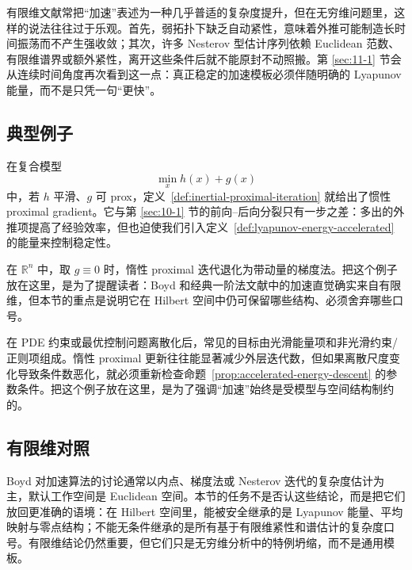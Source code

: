 \begin{remark}[无穷维中的加速边界]\label{remark:acceleration-limitations-infinite-dimensional}
有限维文献常把“加速”表述为一种几乎普适的复杂度提升，但在无穷维问题里，这样的说法往往过于乐观。首先，弱拓扑下缺乏自动紧性，意味着外推可能制造长时间振荡而不产生强收敛；其次，许多 Nesterov 型估计序列依赖 Euclidean 范数、有限维谱界或额外紧性，离开这些条件后就不能原封不动照搬。第 \ref{sec:11-1} 节会从连续时间角度再次看到这一点：真正稳定的加速模板必须伴随明确的 Lyapunov 能量，而不是只凭一句“更快”。
\end{remark}

\subsection{典型例子}

\begin{example}
在复合模型
\[
\min_x h(x)+g(x)
\]
中，若 $h$ 平滑、$g$ 可 prox，定义~\ref{def:inertial-proximal-iteration} 就给出了惯性 proximal gradient。它与第 \ref{sec:10-1} 节的前向--后向分裂只有一步之差：多出的外推项提高了经验效率，但也迫使我们引入定义~\ref{def:lyapunov-energy-accelerated} 的能量来控制稳定性。
\end{example}

\begin{example}
在 $\mathbb R^n$ 中，取 $g\equiv 0$ 时，惰性 proximal 迭代退化为带动量的梯度法。把这个例子放在这里，是为了提醒读者：Boyd 和经典一阶法文献中的加速直觉确实来自有限维，但本节的重点是说明它在 Hilbert 空间中仍可保留哪些结构、必须舍弃哪些口号。
\end{example}

\begin{example}[最优控制离散化后的加速求解]
在 PDE 约束或最优控制问题离散化后，常见的目标由光滑能量项和非光滑约束/正则项组成。惰性 proximal 更新往往能显著减少外层迭代数，但如果离散尺度变化导致条件数恶化，就必须重新检查命题~\ref{prop:accelerated-energy-descent} 的参数条件。把这个例子放在这里，是为了强调“加速”始终是受模型与空间结构制约的。
\end{example}

\subsection*{有限维对照}

Boyd 对加速算法的讨论通常以内点、梯度法或 Nesterov 迭代的复杂度估计为主，默认工作空间是 Euclidean 空间。本节的任务不是否认这些结论，而是把它们放回更准确的语境：在 Hilbert 空间里，能被安全继承的是 Lyapunov 能量、平均映射与零点结构；不能无条件继承的是所有基于有限维紧性和谱估计的复杂度口号。有限维结论仍然重要，但它们只是无穷维分析中的特例坍缩，而不是通用模板。

